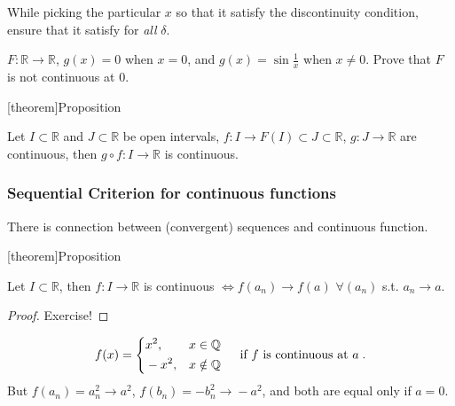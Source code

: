 \documentclass[12pt]{report}
\theoremstyle{definition}
\begin{document}
While picking the particular $x$ so that it satisfy the discontinuity condition,
ensure that it satisfy for \emph{all} $\delta$.
\begin{ex}
    $F:\mathbb{R}\rightarrow{}\mathbb{R}$,
    $g(x)=0$ when $x=0$, and $g(x) = \sin{\frac{1}{x}}$ when $x\neq 0$.
    Prove that $F$ is not continuous at 0.
\end{ex}

[theorem]{Proposition}
\begin{continiuos function composition is continuous}
    Let $I \subset \mathbb{R}$ and $J \subset \mathbb{R}$ be open intervals,
    $f:I\rightarrow{}F(I)\subset J \subset\mathbb{R}$, 
    $g:J\rightarrow{}\mathbb{R}$ are continuous,
    then $g\circ f:I\rightarrow{}\mathbb{R}$ is continuous.
\end{continiuos function composition is continuous}

\subsubsection{Sequential Criterion for continuous functions}

There is connection between (convergent) sequences and continuous function.

[theorem]{Proposition}
\begin{continuous function and sequences}
    Let $I\subset \mathbb{R}$, then $f:I\rightarrow{}\mathbb{R}$ is continuous
    $\iff f(a_n) \rightarrow{} f(a)$ $\forall (a_n)$ s.t. $a_n \rightarrow{}a$.
\end{continuous function and sequences}

\begin{proof}
    Exercise!
\end{proof}

\begin{ex}
    \[
        f(x) = \left\{
            \begin{align*}
                & x^{2}, & x\in \mathbb{Q} \\
                & -x^{2}, & x\notin \mathbb{Q}
            \end{align*}
            \right. \quad\;\textnormal{if $f$ is continuous at $a$}\;.
    \]
    But $f(a_n) = a^{2}_n \rightarrow{}a^{2}$,
    $f(b_n) = -b^{2}_n \rightarrow{} -a^{2}$,
    and both are equal only if $a = 0$.
\end{ex}
\end{document}
